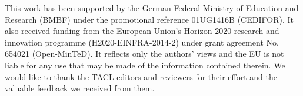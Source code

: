 \documentclass[11pt,letterpaper]{article}
\begin{document}
This work has been supported by the German Federal Ministry of Education and Research (BMBF) 
under the promotional reference 01UG1416B (CEDIFOR).
It also received funding from the European Union's
Horizon 2020 research and innovation programme (H2020-EINFRA-2014-2) under grant agreement No. 654021 
(Open-MinTeD). It reflects only the authors’ views and the EU is 
not liable for any use that may be made of the information contained therein. 
We would like to thank the TACL editors and reviewers for their effort and the valuable feedback we received from them.




\end{document}
